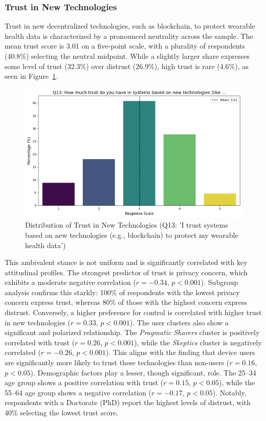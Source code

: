 	\subsubsection{Trust in New Technologies}
		Trust in new decentralized technologies, such as blockchain, to protect wearable health data is characterized by a pronounced neutrality across the sample. The mean trust score is 3.01 on a five-point scale, with a plurality of respondents (40.8\%) selecting the neutral midpoint. While a slightly larger share expresses some level of trust (32.3\%) over distrust (26.9\%), high trust is rare (4.6\%), as seen in Figure~\ref{fig:Q13_trust_newtech}.
		\begin{figure}[ht]\centering
			\includegraphics[width=1\linewidth]{figures/questions/Q13_likert.png}
			\caption{Distribution of Trust in New Technologies (Q13: 'I trust systems based on new technologies (e.g., blockchain) to protect my wearable health data')}
			\label{fig:Q13_trust_newtech}
		\end{figure}
		This ambivalent stance is not uniform and is significantly correlated with key attitudinal profiles. The strongest predictor of trust is privacy concern, which exhibits a moderate negative correlation ($r = -0.34$, $p < 0.001$). Subgroup analysis confirms this starkly: 100\% of respondents with the lowest privacy concern express trust, whereas 80\% of those with the highest concern express distrust. Conversely, a higher preference for control is correlated with higher trust in new technologies ($r = 0.33$, $p < 0.001$).
		The user clusters also show a significant and polarized relationship. The \textit{Pragmatic Sharers} cluster is positively correlated with trust ($r = 0.26$, $p < 0.001$), while the \textit{Skeptics} cluster is negatively correlated ($r = -0.26$, $p < 0.001$). This aligns with the finding that device users are significantly more likely to trust these technologies than non-users ($r = 0.16$, $p < 0.05$).
		Demographic factors play a lesser, though significant, role. The 25--34 age group shows a positive correlation with trust ($r = 0.15$, $p < 0.05$), while the 55--64 age group shows a negative correlation ($r = -0.17$, $p < 0.05$). Notably, respondents with a Doctorate (PhD) report the highest levels of distrust, with 40\% selecting the lowest trust score.

